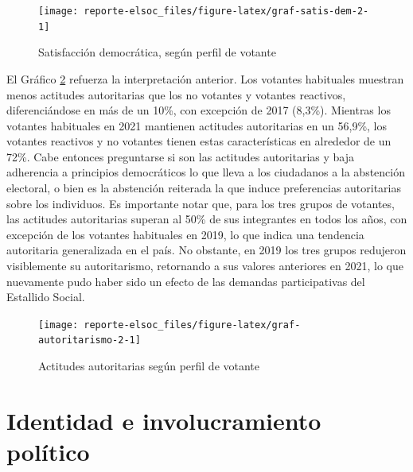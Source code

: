 \documentclass[
  12pt,
]{book}
\begin{document}
\begin{figure}

{\centering \texttt{[image: reporte-elsoc\_files/figure-latex/graf-satis-dem-2-1]} 

}

\caption{Satisfacción democrática, según perfil de votante}\label{fig:graf-satis-dem-2}
\end{figure}

El Gráfico \ref{fig:graf-autoritarismo-2} refuerza la interpretación anterior. Los votantes habituales muestran menos actitudes autoritarias que los no votantes y votantes reactivos, diferenciándose en más de un 10\%, con excepción de 2017 (8,3\%). Mientras los votantes habituales en 2021 mantienen actitudes autoritarias en un 56,9\%, los votantes reactivos y no votantes tienen estas características en alrededor de un 72\%. Cabe entonces preguntarse si son las actitudes autoritarias y baja adherencia a principios democráticos lo que lleva a los ciudadanos a la abstención electoral, o bien es la abstención reiterada la que induce preferencias autoritarias sobre los individuos. Es importante notar que, para los tres grupos de votantes, las actitudes autoritarias superan al 50\% de sus integrantes en todos los años, con excepción de los votantes habituales en 2019, lo que indica una tendencia autoritaria generalizada en el país. No obstante, en 2019 los tres grupos redujeron visiblemente su autoritarismo, retornando a sus valores anteriores en 2021, lo que nuevamente pudo haber sido un efecto de las demandas participativas del Estallido Social.

\begin{figure}

{\centering \texttt{[image: reporte-elsoc\_files/figure-latex/graf-autoritarismo-2-1]} 

}

\caption{Actitudes autoritarias según perfil de votante}\label{fig:graf-autoritarismo-2}
\end{figure}

\hypertarget{identidad-e-involucramiento-poluxedtico}{%
\section{Identidad e involucramiento político}\label{identidad-e-involucramiento-poluxedtico}}
\end{document}
